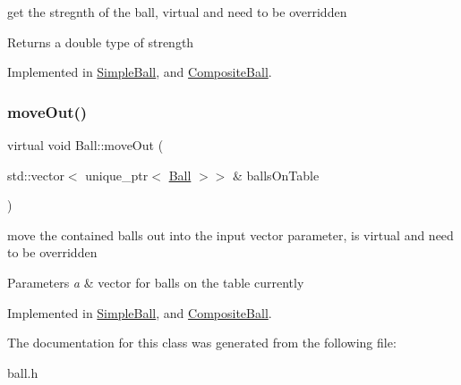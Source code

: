 get the stregnth of the ball, virtual and need to be overridden 

\begin{DoxyReturn}{Returns}
a double type of strength 
\end{DoxyReturn}


Implemented in \mbox{\hyperlink{class_simple_ball_a3a4c5bc776e3788112f02320432ba8cc}{Simple\+Ball}}, and \mbox{\hyperlink{class_composite_ball_a1585c03baf89ce19c58806dfa6eac131}{Composite\+Ball}}.

\mbox{\label{class_ball_a7d3b8c70ee8c61db73692a4d44bbf933}} 
\subsubsection{\texorpdfstring{move\+Out()}{moveOut()}}
{\footnotesize\ttfamily virtual void Ball\+::move\+Out (\begin{DoxyParamCaption}\item[{std\+::vector$<$ unique\+\_\+ptr$<$ \mbox{\hyperlink{class_ball}{Ball}} $>$$>$ \&}]{balls\+On\+Table }\end{DoxyParamCaption})\hspace{0.3cm}{\ttfamily [pure virtual]}}



move the contained balls out into the input vector parameter, is virtual and need to be overridden 


\begin{DoxyParams}{Parameters}
{\em a} & vector for balls on the table currently \\
\hline
\end{DoxyParams}


Implemented in \mbox{\hyperlink{class_simple_ball_a1af03353f6c3414e6ce7c12a9b338e72}{Simple\+Ball}}, and \mbox{\hyperlink{class_composite_ball_a2bf10829db0790d8a42529fafaf8c7b4}{Composite\+Ball}}.



The documentation for this class was generated from the following file\+:\begin{DoxyCompactItemize}
\item 
ball.\+h\end{DoxyCompactItemize}
